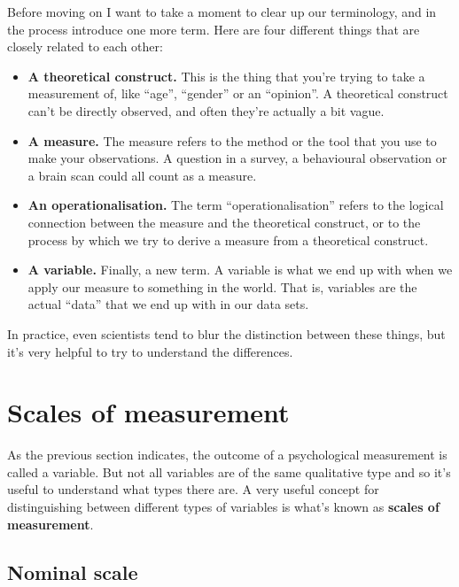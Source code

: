 \documentclass[
  a4paper,
]{book}
\providecommand{\tightlist}{%
  \setlength{\itemsep}{0pt}\setlength{\parskip}{0pt}}
\begin{document}
Before moving on I want to take a moment to clear up our terminology,
and in the process introduce one more term. Here are four different
things that are closely related to each other:

\begin{itemize}
\tightlist
\item
  \textbf{A theoretical construct.} This is the thing that you're trying
  to take a measurement of, like ``age'', ``gender'' or an ``opinion''.
  A theoretical construct can't be directly observed, and often they're
  actually a bit vague.
\item
  \textbf{A measure.} The measure refers to the method or the tool that
  you use to make your observations. A question in a survey, a
  behavioural observation or a brain scan could all count as a measure.
\item
  \textbf{An operationalisation.} The term ``operationalisation'' refers
  to the logical connection between the measure and the theoretical
  construct, or to the process by which we try to derive a measure from
  a theoretical construct.
\item
  \textbf{A variable.} Finally, a new term. A variable is what we end up
  with when we apply our measure to something in the world. That is,
  variables are the actual ``data'' that we end up with in our data
  sets.
\end{itemize}

In practice, even scientists tend to blur the distinction between these
things, but it's very helpful to try to understand the differences.

\section{Scales of measurement}\label{sec-Scales-of-measurement}

As the previous section indicates, the outcome of a psychological
measurement is called a variable. But not all variables are of the same
qualitative type and so it's useful to understand what types there are.
A very useful concept for distinguishing between different types of
variables is what's known as \textbf{scales of measurement}.

\subsection{Nominal scale}\label{nominal-scale}
\end{document}
